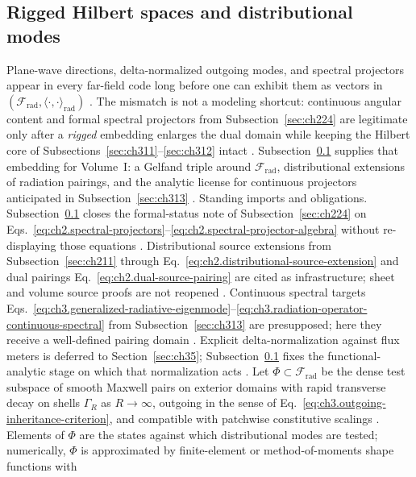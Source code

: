 \subsection{Rigged Hilbert spaces and distributional modes}
\label{sec:ch314}
Plane-wave directions, delta-normalized outgoing modes, and spectral projectors appear in every
far-field code long before one can exhibit them as vectors in
\((\mathcal{F}_{\mathrm{rad}},\langle\cdot,\cdot\rangle_{\mathrm{rad}})\)
\cite{jackson1999}. The mismatch is not a modeling shortcut: continuous
angular content and formal spectral projectors from Subsection~\ref{sec:ch224} are legitimate only after
a \emph{rigged} embedding enlarges the dual domain while keeping the Hilbert core of
Subsections~\ref{sec:ch311}--\ref{sec:ch312} intact \cite{kato1995}. Subsection~\ref{sec:ch314}
supplies that embedding for Volume~I: a Gelfand triple around \(\mathcal{F}_{\mathrm{rad}}\), distributional
extensions of radiation pairings, and the analytic license for continuous projectors anticipated in
Subsection~\ref{sec:ch313} \cite{harrington2001}.
Standing imports and obligations. Subsection~\ref{sec:ch314} closes the formal-status note of Subsection~\ref{sec:ch224} on
Eqs.~\eqref{eq:ch2.spectral-projectors}--\eqref{eq:ch2.spectral-projector-algebra} without re-displaying
those equations \cite{stratton1941}. Distributional source extensions from
Subsection~\ref{sec:ch211} through Eq.~\eqref{eq:ch2.distributional-source-extension} and dual pairings
Eq.~\eqref{eq:ch2.dual-source-pairing} are cited as infrastructure; sheet and volume source proofs are not
reopened \cite{stratton1941}. Continuous spectral targets
Eqs.~\eqref{eq:ch3.generalized-radiative-eigenmode}--\eqref{eq:ch3.radiation-operator-continuous-spectral}
from Subsection~\ref{sec:ch313} are presupposed; here they receive a well-defined pairing domain
\cite{harrington2001}. Explicit delta-normalization against flux meters is deferred to
Section~\ref{sec:ch35}; Subsection~\ref{sec:ch314} fixes the functional-analytic stage on which that
normalization acts \cite{stratton1941}.
Let \(\Phi\subset\mathcal{F}_{\mathrm{rad}}\) be the dense test subspace of smooth Maxwell pairs on
exterior domains with rapid transverse decay on shells \(\Gamma_R\) as \(R\to\infty\), outgoing in the sense
of Eq.~\eqref{eq:ch3.outgoing-inheritance-criterion}, and compatible with patchwise constitutive scalings
\cite{stratton1941}. Elements of \(\Phi\) are the states against which distributional modes
are tested; numerically, \(\Phi\) is approximated by finite-element or method-of-moments shape functions with
